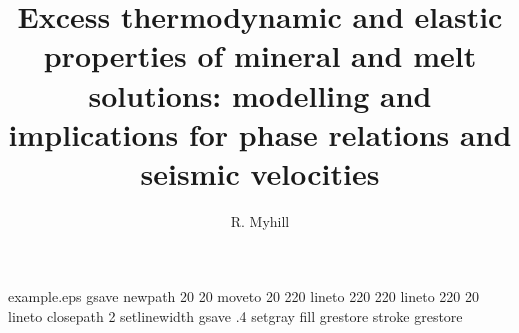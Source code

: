 %
%
%
%
%
\begin{filecontents*}{example.eps}
gsave
newpath
  20 20 moveto
  20 220 lineto
  220 220 lineto
  220 20 lineto
closepath
2 setlinewidth
gsave
  .4 setgray fill
grestore
stroke
grestore
\end{filecontents*}
%
\RequirePackage{fix-cm}
%
\documentclass[smallextended]{svjour3}       %
%
\smartqed  %
%
\usepackage{graphicx}
%
%
\usepackage{natbib}
%
%
%

\usepackage{amsmath}    



\title{Excess thermodynamic and elastic properties of mineral and melt solutions: modelling and implications for phase relations and seismic velocities}


\author{R. Myhill}



